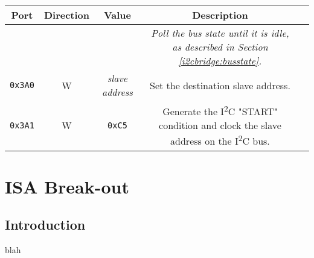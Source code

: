 \documentclass[twoside,10pt,letterpaper]{refart}
\newcommand{\itwoc}{I\textsuperscript{2}C}
\begin{document}
\begin{center}
    \begin{tabular}{ c|c|c|c|c }
        \textbf{Port} & \textbf{Direction} & \textbf{Value} & \textbf{Description} \\
        \hline
        & & & \textit{Poll the bus state until it is idle, as described in Section \ref{i2cbridge:busstate}.} \\
        \texttt{0x3A0} & W & \textit{slave address} & Set the destination slave address. \\
        \texttt{0x3A1} & W & \texttt{0xC5} & Generate the \itwoc{} "START" condition and clock the slave address on the \itwoc{} bus. \\
    \end{tabular}
\end{center}

\newpage

\section{ISA Break-out}

\subsection{Introduction}
blah
\end{document}
